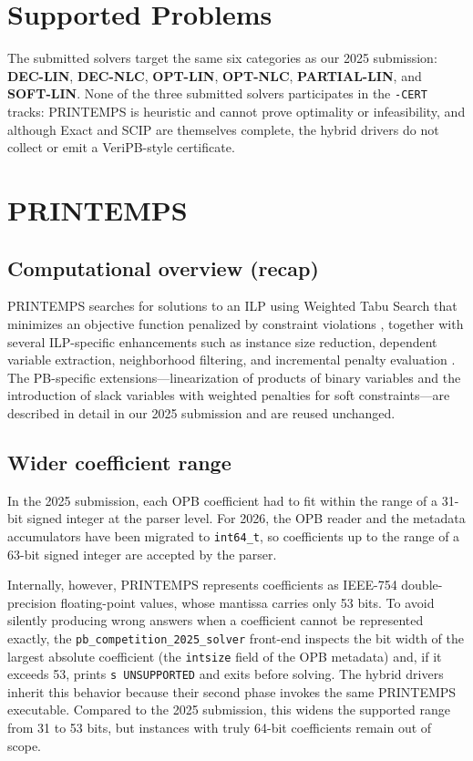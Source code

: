 \documentclass[conference]{IEEEtran}
\begin{document}
\section{Supported Problems}
The submitted solvers target the same six categories as our 2025 submission: \textbf{DEC-LIN}, \textbf{DEC-NLC}, \textbf{OPT-LIN}, \textbf{OPT-NLC}, \textbf{PARTIAL-LIN}, and \textbf{SOFT-LIN}. None of the three submitted solvers participates in the \texttt{-CERT} tracks: PRINTEMPS is heuristic and cannot prove optimality or infeasibility, and although Exact and SCIP are themselves complete, the hybrid drivers do not collect or emit a VeriPB-style certificate.

\section{PRINTEMPS}

\subsection{Computational overview (recap)}
PRINTEMPS searches for solutions to an ILP using Weighted Tabu Search that minimizes an objective function penalized by constraint violations \cite{Nonobe.1998}, together with several ILP-specific enhancements such as instance size reduction, dependent variable extraction, neighborhood filtering, and incremental penalty evaluation \cite{Koguma.2024}. The PB-specific extensions---linearization of products of binary variables and the introduction of slack variables with weighted penalties for soft constraints---are described in detail in our 2025 submission \cite{printemps-pb25} and are reused unchanged.

\subsection{Wider coefficient range}\label{sec:coeff}
In the 2025 submission, each OPB coefficient had to fit within the range of a 31-bit signed integer at the parser level. For 2026, the OPB reader and the metadata accumulators have been migrated to \texttt{int64\_t}, so coefficients up to the range of a 63-bit signed integer are accepted by the parser.

Internally, however, PRINTEMPS represents coefficients as IEEE-754 double-precision floating-point values, whose mantissa carries only 53 bits. To avoid silently producing wrong answers when a coefficient cannot be represented exactly, the \texttt{pb\_competition\_2025\_solver} front-end inspects the bit width of the largest absolute coefficient (the \texttt{intsize} field of the OPB metadata) and, if it exceeds 53, prints \texttt{s UNSUPPORTED} and exits before solving. The hybrid drivers inherit this behavior because their second phase invokes the same PRINTEMPS executable. Compared to the 2025 submission, this widens the supported range from 31 to 53 bits, but instances with truly 64-bit coefficients remain out of scope.
\end{document}
